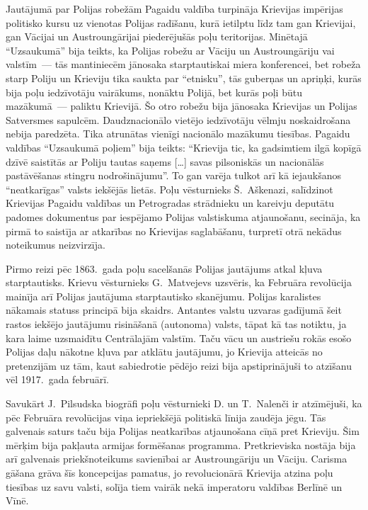 \documentclass[twoside,a5paper,12pt,fleqn,openany]{extbook}
\newcommand{\citespace}{[\dots{}]}
\begin{document}
Jautājumā par Polijas robežām Pagaidu valdība turpināja Krievijas impērijas politisko kursu uz vienotas Polijas radīšanu, kurā ietilptu līdz tam gan Krievijai, gan Vācijai un Austroungārijai piederējušās poļu teritorijas. Minētajā ``Uzsaukumā'' bija teikts, ka Polijas robežu ar Vāciju un Austroungāriju vai valstīm~--- tās mantiniecēm jānosaka starptautiskai miera konferencei, bet robeža starp Poliju un Krieviju tika saukta par ``etnisku'', tās guberņas un apriņķi, kurās bija poļu iedzīvotāju vairākums, nonāktu Polijā, bet kurās poļi būtu mazākumā~--- paliktu Krievijā. Šo otro robežu bija jānosaka Krievijas un Polijas Satversmes sapulcēm. Daudznacionālo vietējo iedzīvotāju vēlmju noskaidrošana nebija paredzēta. Tika atrunātas vienīgi nacionālo mazākumu tiesības. Pagaidu valdības ``Uzsaukumā poļiem'' bija teikts: ``Krievija tic, ka gadsimtiem ilgā kopīgā dzīvē saistītās ar Poliju tautas saņems \citespace{} savas pilsoniskās un nacionālās pastāvēšanas stingru nodrošinājumu''. To gan varēja tulkot arī kā iejaukšanos ``neatkarīgas'' valsts iekšējās lietās. Poļu vēsturnieks Š.~Aškenazi, salīdzinot Krievijas Pagaidu valdības un Petrogradas strādnieku un kareivju deputātu padomes dokumentus par iespējamo Polijas valstiskuma atjaunošanu, secināja, ka pirmā to saistīja ar atkarības no Krievijas saglabāšanu, turpretī otrā nekādus noteikumus neizvirzīja.

Pirmo reizi pēc 1863.~gada poļu sacelšanās Polijas jautājums atkal kļuva starptautisks. Krievu vēsturnieks G.~Matvejevs uzsvēris, ka Februāra revolūcija mainīja arī Polijas jautājuma starptautisko skanējumu. Polijas karalistes nākamais statuss principā bija skaidrs. Antantes valstu uzvaras gadījumā šeit rastos iekšējo jautājumu risināšanā (autonoma) valsts, tāpat kā tas notiktu, ja kara laime uzsmaidītu Centrālajām valstīm. Taču vācu un austriešu rokās esošo Polijas daļu nākotne kļuva par atklātu jautājumu, jo Krievija atteicās no pretenzijām uz tām, kaut sabiedrotie pēdējo reizi bija apstiprinājuši to atzīšanu vēl 1917.~gada februārī.

Savukārt J.~Pilsudska biogrāfi poļu vēsturnieki D. un T.~Nalenči ir atzīmējuši, ka pēc Februāra revolūcijas viņa iepriekšējā politiskā līnija zaudēja jēgu. Tās galvenais saturs taču bija Polijas neatkarības atjaunošana cīņā pret Krieviju. Šim mērķim bija pakļauta armijas formēšanas programma. Pretkrieviska nostāja bija arī galvenais priekšnoteikums savienībai ar Austroungāriju un Vāciju. Carisma gāšana grāva šīs koncepcijas pamatus, jo revolucionārā Krievija atzina poļu tiesības uz savu valsti, solīja tiem vairāk nekā imperatoru valdības Berlīnē un Vīnē.
\end{document}
